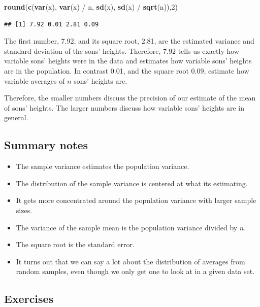 \documentclass[]{article}
\newenvironment{Shaded}{\begin{snugshade}}{\end{snugshade}}
\newcommand{\KeywordTok}[1]{\textcolor[rgb]{0.13,0.29,0.53}{\textbf{{#1}}}}
\newcommand{\DecValTok}[1]{\textcolor[rgb]{0.00,0.00,0.81}{{#1}}}
\newcommand{\StringTok}[1]{\textcolor[rgb]{0.31,0.60,0.02}{{#1}}}
\newcommand{\NormalTok}[1]{{#1}}
\begin{document}
\begin{Shaded}
\begin{Highlighting}[]
\KeywordTok{round}\NormalTok{(}\KeywordTok{c}\NormalTok{(}\KeywordTok{var}\NormalTok{(x), }\KeywordTok{var}\NormalTok{(x) /}\StringTok{ }\NormalTok{n, }\KeywordTok{sd}\NormalTok{(x), }\KeywordTok{sd}\NormalTok{(x) /}\StringTok{ }\KeywordTok{sqrt}\NormalTok{(n)),}\DecValTok{2}\NormalTok{)}
\end{Highlighting}
\end{Shaded}

\begin{verbatim}
## [1] 7.92 0.01 2.81 0.09
\end{verbatim}

The first number, 7.92, and its square root, 2.81, are the estimated
variance and standard deviation of the sons' heights. Therefore, 7.92
tells us exactly how variable sons' heights were in the data and
estimates how variable sons' heights are in the population. In contrast
0.01, and the square root 0.09, estimate how variable averages of $n$
sons' heights are.

Therefore, the smaller numbers discuss the precision of our estimate of
the mean of sons' heights. The larger numbers discuss how variable sons'
heights are in general.

\subsection{Summary notes}\label{summary-notes-3}

\begin{itemize}
\itemsep1pt\parskip0pt
\item
  The sample variance estimates the population variance.
\item
  The distribution of the sample variance is centered at what its
  estimating.
\item
  It gets more concentrated around the population variance with larger
  sample sizes.
\item
  The variance of the sample mean is the population variance divided by
  $n$.
\item
  The square root is the standard error.
\item
  It turns out that we can say a lot about the distribution of averages
  from random samples, even though we only get one to look at in a given
  data set.
\end{itemize}

\subsection{Exercises}\label{exercises-4}
\end{document}
